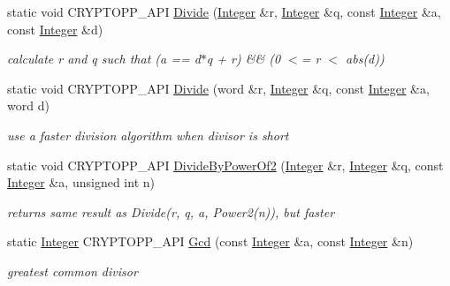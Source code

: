 \begin{DoxyCompactItemize}
\item 
\hypertarget{class_integer_a3109a2d9230072543d30f6837ab0f505}{
static void CRYPTOPP\_\-API \hyperlink{class_integer_a3109a2d9230072543d30f6837ab0f505}{Divide} (\hyperlink{class_integer}{Integer} \&r, \hyperlink{class_integer}{Integer} \&q, const \hyperlink{class_integer}{Integer} \&a, const \hyperlink{class_integer}{Integer} \&d)}
\label{class_integer_a3109a2d9230072543d30f6837ab0f505}

\begin{DoxyCompactList}\small\item\em calculate r and q such that (a == d$\ast$q + r) \&\& (0 $<$= r $<$ abs(d)) \item\end{DoxyCompactList}\item 
\hypertarget{class_integer_aa70e4657fec789c7d3b0a414a764304a}{
static void CRYPTOPP\_\-API \hyperlink{class_integer_aa70e4657fec789c7d3b0a414a764304a}{Divide} (word \&r, \hyperlink{class_integer}{Integer} \&q, const \hyperlink{class_integer}{Integer} \&a, word d)}
\label{class_integer_aa70e4657fec789c7d3b0a414a764304a}

\begin{DoxyCompactList}\small\item\em use a faster division algorithm when divisor is short \item\end{DoxyCompactList}\item 
\hypertarget{class_integer_a67bec0194f1e0e45c874397c4fc3d4c3}{
static void CRYPTOPP\_\-API \hyperlink{class_integer_a67bec0194f1e0e45c874397c4fc3d4c3}{DivideByPowerOf2} (\hyperlink{class_integer}{Integer} \&r, \hyperlink{class_integer}{Integer} \&q, const \hyperlink{class_integer}{Integer} \&a, unsigned int n)}
\label{class_integer_a67bec0194f1e0e45c874397c4fc3d4c3}

\begin{DoxyCompactList}\small\item\em returns same result as Divide(r, q, a, Power2(n)), but faster \item\end{DoxyCompactList}\item 
\hypertarget{class_integer_a05561dff8425818e1ba0757d2bb50a18}{
static \hyperlink{class_integer}{Integer} CRYPTOPP\_\-API \hyperlink{class_integer_a05561dff8425818e1ba0757d2bb50a18}{Gcd} (const \hyperlink{class_integer}{Integer} \&a, const \hyperlink{class_integer}{Integer} \&n)}
\label{class_integer_a05561dff8425818e1ba0757d2bb50a18}

\begin{DoxyCompactList}\small\item\em greatest common divisor \item\end{DoxyCompactList}\end{DoxyCompactItemize}
